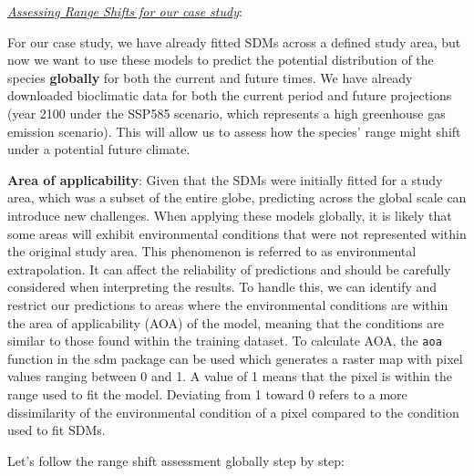 \documentclass[
]{article}
\begin{document}
\uline{\textit{Assessing Range Shifts for our case study}}:

For our case study, we have already fitted SDMs across a defined study
area, but now we want to use these models to predict the potential
distribution of the species \textbf{globally} for both the current and
future times. We have already downloaded bioclimatic data for both the
current period and future projections (year 2100 under the SSP585
scenario, which represents a high greenhouse gas emission scenario).
This will allow us to assess how the species' range might shift under a
potential future climate.

\textbf{Area of applicability}: Given that the SDMs were initially
fitted for a study area, which was a subset of the entire globe,
predicting across the global scale can introduce new challenges. When
applying these models globally, it is likely that some areas will
exhibit environmental conditions that were not represented within the
original study area. This phenomenon is referred to as environmental
extrapolation. It can affect the reliability of predictions and should
be carefully considered when interpreting the results. To handle this,
we can identify and restrict our predictions to areas where the
environmental conditions are within the area of applicability (AOA) of
the model, meaning that the conditions are similar to those found within
the training dataset. To calculate AOA, the \texttt{aoa} function in the
sdm package can be used which generates a raster map with pixel values
ranging between 0 and 1. A value of 1 means that the pixel is within the
range used to fit the model. Deviating from 1 toward 0 refers to a more
dissimilarity of the environmental condition of a pixel compared to the
condition used to fit SDMs.

Let's follow the range shift assessment globally step by step:
\end{document}
